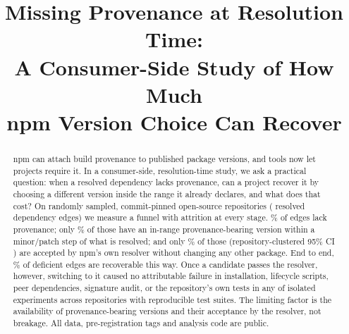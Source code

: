 \documentclass[conference]{IEEEtran}
\begin{document}
\title{Missing Provenance at Resolution Time:\\A Consumer-Side Study of How Much\\npm Version Choice Can Recover}

\author{
\and
{}
\and
\IEEEauthorblockN{Jaswanth Raj}
}

\maketitle

\begin{abstract}
npm can attach build provenance to published package versions, and tools now
let projects require it. In a consumer-side, resolution-time study, we ask a
practical question: when a resolved
dependency lacks provenance, can a project recover it by choosing a different
version inside the range it already declares, and what does that cost? On
\SRepos{} randomly sampled, commit-pinned open-source repositories
(\SEdges{} resolved dependency edges) we measure a funnel with attrition at
every stage. \SOPG\% of edges lack provenance; only \SProxyPct\% of those have
an in-range provenance-bearing version within a minor/patch step of what is
resolved; and only \SLPct\% of those (repository-clustered 95\% CI \SLCi) are
accepted by npm's own resolver without changing any other package. End to end,
\SEndToEnd\% of deficient edges are recoverable this way. Once a candidate passes
the resolver, however, switching to it caused no attributable failure in
installation, lifecycle scripts, peer dependencies, signature audit, or the
repository's own tests in any of \SExp{} isolated experiments across
\STestable{} repositories with reproducible test suites. The limiting factor is
the availability of provenance-bearing versions and their acceptance by the
resolver, not breakage. All data, pre-registration tags and analysis code are
public.
\end{abstract}
\end{document}
